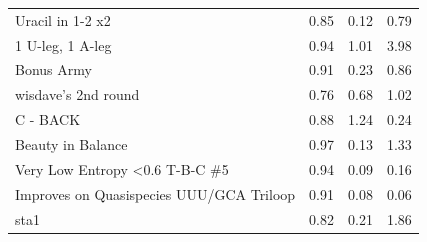 \documentclass[letter]{bioinfo}
\begin{document}
\begin{center}
\begin{longtable}{l ccc}
Uracil in 1-2 x2				&0.85 	&0.12 	&0.79 \\
1 U-leg, 1 A-leg				&0.94 	&1.01 	&3.98 \\
Bonus Army					&0.91 	&0.23 	&0.86 \\
wisdave's 2nd round			&0.76 	&0.68 	&1.02 \\
C - BACK						&0.88 	&1.24 	&0.24 \\
Beauty in Balance				&0.97 	&0.13 	&1.33 \\
Very Low Entropy <0.6 T-B-C \#5	&0.94 	&0.09 	&0.16 \\
Improves on Quasispecies UUU/GCA Triloop	&0.91 	&0.08 	&0.06 \\
sta1							&0.82 	&0.21 	&1.86 \\

\end{longtable}
\end{center}



\newpage



\end{document}
